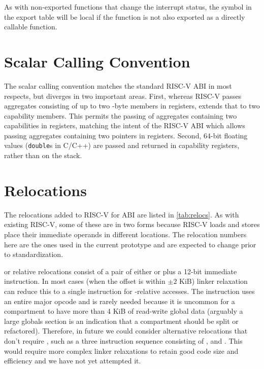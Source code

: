 As with non-exported functions that change the interrupt status, the symbol in the export table will be local if the function is not also exported as a directly callable function.

\section{Scalar Calling Convention}

The \cherimcu{} scalar calling convention matches the standard RISC-V ABI in most respects, but diverges in two important areas.
First, whereas RISC-V passes aggregates consisting of up to two \xlen-byte members in registers, \cherimcu{} extends that to two capability members.
This permits the passing of aggregates containing two capabilities in registers, matching the intent of the RISC-V ABI which allows passing aggregates containing two pointers in registers.
Second, 64-bit floating values (\texttt{double}s in C/C++) are passed and returned in capability registers, rather than on the stack.

\section{Relocations}
\label{sec:relocs}

The relocations added to RISC-V for \cherimcu{} ABI are listed in \cref{tab:relocs}.
As with existing RISC-V, some of these are in two forms because RISC-V loads and stores place their immediate operands in different locations.
The relocation numbers here are the ones used in the current prototype and are expected to change prior to standardization.

\PCC{} or \CGP{} relative relocations consist of a pair of either  or  plus a 12-bit immediate instruction.
In most cases (when the offset is within $\pm2$ KiB) linker relaxation can reduce this to a single instruction for \CGP-relative accesses.
The  instruction uses an entire major opcode and is rarely needed because it is uncommon for a compartment to have more than 4 KiB of read-write global data (arguably a large globals section is an indication that a compartment should be split or refactored).
Therefore, in future we could consider alternative relocations that don't require , such as a three instruction sequence consisting of ,  and .
This would require more complex linker relaxations to retain good code size and efficiency and we have not yet attempted it.

